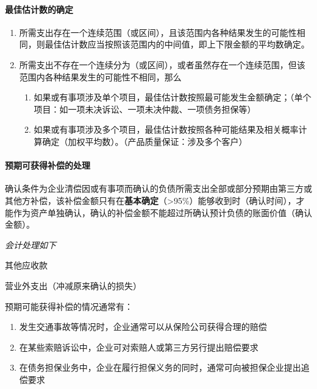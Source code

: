 \documentclass[UTF8,12pt]{ctexart}
\newenvironment{Dr}{%
	\begin{list}{}%
		{
			\setlength{\leftmargin}{2em}
			\setlength{\labelwidth}{2em}
			\setlength{\labelsep}{0pt}
			\setlength{\itemindent}{0pt}
			\setlength{\listparindent}{0pt}
			\setlength{\parsep}{0pt}
			\setlength{\topsep}{0pt}
		}
		\item[\textbf{借：}]
	}{%
	\end{list}
}
\newenvironment{Cr}{%
	\begin{list}{}%
		{
			\setlength{\leftmargin}{3em}
			\setlength{\labelwidth}{2em}
			\setlength{\labelsep}{0pt}
			\setlength{\itemindent}{0pt}
			\setlength{\listparindent}{0pt}
			\setlength{\parsep}{0pt}
			\setlength{\topsep}{0pt}
		}
		\item[\textbf{贷：}]
	}{%
	\end{list}
}
\numberwithin{equation}{section} %
\numberwithin{figure}{section}
\numberwithin{table}{section}
\begin{document}
	\paragraph{最佳估计数的确定}
	\begin{enumerate}
		\item 所需支出存在一个连续范围（或区间），且该范围内各种结果发生的可能性相同，则最佳估计数应当按照该范围内的中间值，即上下限金额的平均数确定。
		
		\item 所需支出不存在一个连续分为（或区间），或者虽然存在一个连续范围，但该范围内各种结果发生的可能性不相同，那么
		\begin{enumerate}
			\item 如果或有事项涉及单个项目，最佳估计数按照最可能发生金额确定；（单个项目：如一项未决诉讼、一项未决仲裁、一项债务担保等）
			
			\item 如果或有事项涉及多个项目，最佳估计数按照各种可能结果及相关概率计算确定（加权平均数）。（产品质量保证：涉及多个客户）
		\end{enumerate}
	\end{enumerate}
	
	
	\paragraph{预期可获得补偿的处理}
	确认条件为企业清偿因或有事项而确认的负债所需支出全部或部分预期由第三方或其他方补偿，该补偿金额只有在\textbf{基本确定}（>95\%）能够收到时（确认时间），才能作为资产单独确认，确认的补偿金额不能超过所确认预计负债的账面价值（确认金额）。
	
	\textit{会计处理如下}
	
	\begin{Dr}
		其他应收款
	\end{Dr}
	\begin{Cr}
		营业外支出（冲减原来确认的损失）
	\end{Cr}
	
	预期可能获得补偿的情况通常有：
	\begin{enumerate}
		\item 发生交通事故等情况时，企业通常可以从保险公司获得合理的赔偿
		
		\item 在某些索赔诉讼中，企业可对索赔人或第三方另行提出赔偿要求
		
		\item 在债务担保业务中，企业在履行担保义务的同时，通常可向被担保企业提出追偿要求
	\end{enumerate}
	
\end{document}
